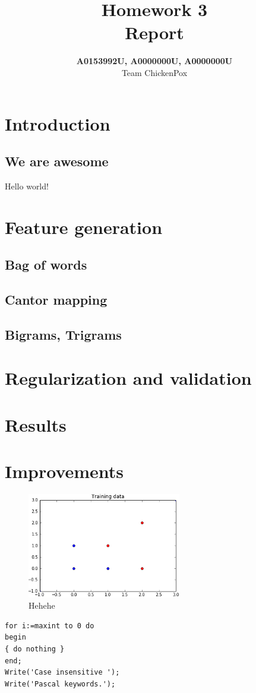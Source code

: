\documentclass[a4paper]{article}
\title{Homework 3 \\ \large Report}
\author{\textbf{A0153992U, A0000000U, A0000000U} \\ Team ChickenPox}
\date{}
\numberwithin{equation}{section}
\begin{document}
\maketitle

\section{Introduction}

\subsection{We are awesome}

Hello world!

\section{Feature generation}

\subsection{Bag of words}

\subsection{Cantor mapping}

\subsection{Bigrams, Trigrams}

\section{Regularization and validation}

\section{Results}

\section{Improvements}

\begin{figure}[h!]
	\centering
	\includegraphics[page=1,width=0.60\textwidth]{diagram.png}
	\caption{\label{fig:diagram}{Hehehe}}
\end{figure}

\begin{lstlisting}[frame=single]
for i:=maxint to 0 do
begin
{ do nothing }
end;
Write('Case insensitive ');
Write('Pascal keywords.');
\end{lstlisting}
\end{document}
